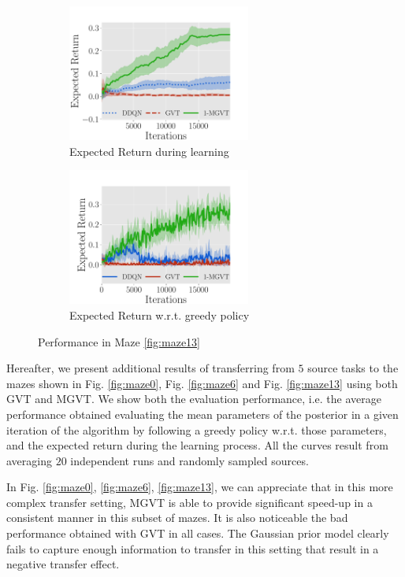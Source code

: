 \documentclass{article}
\begin{document}
\begin{figure}[h]
  \begin{subfigure}[b]{0.45\textwidth}
    \includegraphics[trim=0.0cm 0cm 1.8cm 1.3cm,clip=true,height=4.5cm]{images/maze/lrev_maze13.pdf}
    \caption{Expected Return during learning}
  \end{subfigure}
  \begin{subfigure}[b]{0.45\textwidth}
    \includegraphics[trim=0.0cm 0cm 1.8cm 1.3cm,clip=true,height=4.5cm]{images/maze/erew_maze13.pdf}
    \caption{Expected Return w.r.t. greedy policy}
  \end{subfigure}
  \caption{Performance in Maze \ref{fig:maze13} }
  \label{fig:rew-maze13}
\end{figure}

Hereafter, we present additional results of transferring from $5$ source tasks to the mazes shown in Fig. \ref{fig:maze0}, Fig. \ref{fig:maze6} and Fig. \ref{fig:maze13} using both GVT and MGVT. We show both the evaluation performance, i.e. the average performance obtained evaluating the mean parameters of the posterior in a given iteration of the algorithm by following a greedy policy w.r.t. those parameters, and the expected return during the learning process. All the curves result from averaging $20$ independent runs and randomly sampled sources.

In Fig. \ref{fig:maze0}, \ref{fig:maze6}, \ref{fig:maze13}, we can appreciate that in this more complex transfer setting, MGVT is able to provide significant speed-up in a consistent manner in this subset of mazes. It is also noticeable the bad performance obtained with GVT in all cases. The Gaussian prior model clearly fails to capture enough information to transfer in this setting that result in a negative transfer effect.
\end{document}
